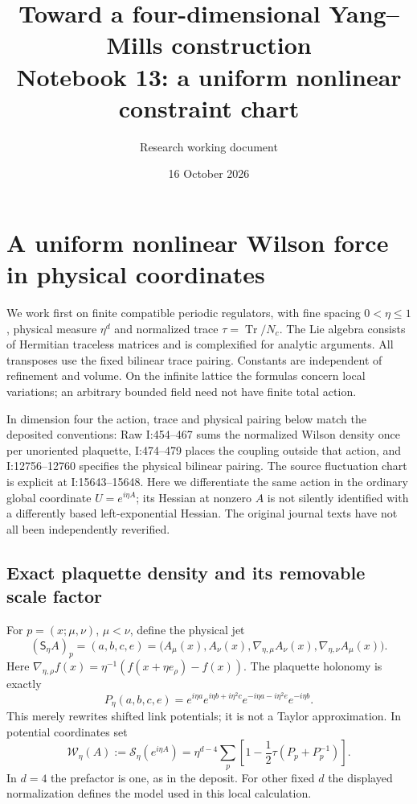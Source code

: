 \documentclass[11pt]{article}
\title{Toward a four-dimensional Yang--Mills construction\\
\large Notebook 13: a uniform nonlinear constraint chart}
\author{Research working document}
\date{16 October 2026}
\theoremstyle{remark}
\newcommand{\norm}[1]{\left\|#1\right\|}
\begin{document}

\section{A uniform nonlinear Wilson force in physical coordinates}
\label{wf-section}

We work first on finite compatible periodic regulators, with
fine spacing $0<\eta\le1$, physical measure $\eta^d$ and
normalized trace $\tau=\operatorname{Tr}/N_c$. The Lie algebra
consists of Hermitian traceless matrices and is complexified for
analytic arguments. All transposes use the fixed bilinear trace
pairing. Constants are independent of refinement and volume.
On the infinite lattice the formulas concern local variations;
an arbitrary bounded field need not have finite total action.

In dimension four the action, trace and physical pairing below
match the deposited conventions: Raw I:454--467 sums the
normalized Wilson density once per unoriented plaquette,
I:474--479 places the coupling outside that action, and
I:12756--12760 specifies the physical bilinear pairing.
The source fluctuation chart is explicit at I:15643--15648.
Here we differentiate the same action in the ordinary global
coordinate $U=e^{i\eta A}$; its Hessian at nonzero $A$ is not
silently identified with a differently based left-exponential
Hessian. The original journal texts have not all been
independently reverified.

\subsection{Exact plaquette density and its removable scale factor}

For $p=(x;\mu,\nu)$, $\mu<\nu$, define the physical jet
\begin{equation}\label{wf-jet}
 (\mathsf S_\eta A)_p=(a,b,c,e)
  =\bigl(A_\mu(x),A_\nu(x),
       \nabla_{\eta,\mu}A_\nu(x),
       \nabla_{\eta,\nu}A_\mu(x)\bigr).
\end{equation}
Here $\nabla_{\eta,\rho}f(x)
=\eta^{-1}(f(x+\eta e_\rho)-f(x))$. The plaquette
holonomy is exactly
\begin{equation}\label{wf-plaquette}
 P_\eta(a,b,c,e)
  =e^{i\eta a}e^{i\eta b+i\eta^2c}
                    e^{-i\eta a-i\eta^2e}e^{-i\eta b}.
\end{equation}
This merely rewrites shifted link potentials; it is not a
Taylor approximation. In potential coordinates set
\begin{equation}\label{wf-action}
 \mathcal W_\eta(A):=\mathcal S_\eta(e^{i\eta A})
   =\eta^{d-4}\sum_p
          \left[1-\frac12\tau(P_p+P_p^{-1})\right].
\end{equation}
In $d=4$ the prefactor is one, as in the deposit. For other
fixed $d$ the displayed normalization defines the model used
in this local calculation.
\end{document}
